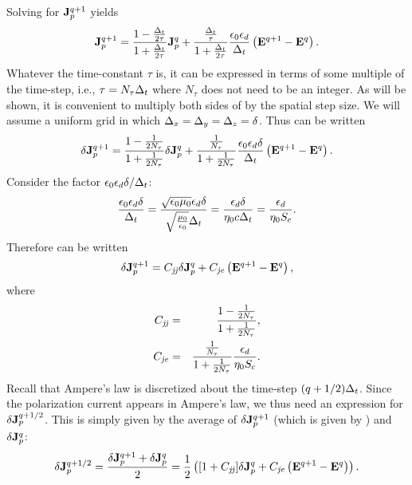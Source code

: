 Solving  for $\mathbf{J}_p^{q+1}$ yields
\begin{equation}
  \mathbf{J}_p^{q+1} =
    \frac{1-\frac{\Delta_t}{2\tau}}{1+\frac{\Delta_t}{2\tau}}\mathbf{J}_p^q +
    \frac{\frac{\Delta_t}{\tau}}{1+\frac{\Delta_t}{2\tau}}
    \frac{\epsilon_0\epsilon_d}{\Delta_t}
    \left(\mathbf{E}^{q+1}-\mathbf{E}^q\right).
    \label{eq:jpUpdateDebyeI}
\end{equation}
Whatever the  time-constant $\tau$ is, it can be expressed in terms of
some multiple of the time-step, i.e., $\tau=N_\tau\Delta_t$ where
$N_\tau$ does not need to be an integer.  As will be shown, it is
convenient to multiply both sides of  by the
spatial step size.  We will assume a uniform grid in which
$\Delta_x=\Delta_y=\Delta_z=\delta$.  Thus  can be
written
\begin{equation}
  \delta\mathbf{J}_p^{q+1} =
    \frac{1-\frac{1}{2N_\tau}}{1+\frac{1}{2N_\tau}}\delta\mathbf{J}_p^q +
    \frac{\frac{1}{N_\tau}}{1+\frac{1}{2N_\tau}}
    \frac{\epsilon_0\epsilon_d\delta}{\Delta_t}\left(\mathbf{E}^{q+1}-\mathbf{E}^q\right).
    \label{eq:jpUpdateDebyeII}
\end{equation}
Consider the factor $\epsilon_0\epsilon_d\delta/\Delta_t$:
\begin{equation}
  \frac{\epsilon_0\epsilon_d\delta}{\Delta_t} =
  \frac{\sqrt{\epsilon_0\mu_0}\epsilon_d\delta}{\sqrt{\frac{\mu_0}{\epsilon_0}}\Delta_t}
  =
  \frac{\epsilon_d\delta}{\eta_0 c\Delta_t} =
  \frac{\epsilon_d}{\eta_0 S_c}.
\end{equation}
Therefore  can be written
\begin{equation}
  \delta\mathbf{J}_p^{q+1} =
    C_{\mathit{jj}}\delta\mathbf{J}_p^q +
    C_{\mathit{je}}\left(\mathbf{E}^{q+1}-\mathbf{E}^q\right),
    \label{eq:jpUpdateDebyeIII}
\end{equation}
where
\begin{eqnarray}
  C_{\mathit{jj}} &=& \frac{1-\frac{1}{2N_\tau}}{1+\frac{1}{2N_\tau}}, \\
  C_{\mathit{je}} &=& \frac{\frac{1}{N_\tau}}{1+\frac{1}{2N_\tau}}
             \frac{\epsilon_d}{\eta_0 S_c}.
\end{eqnarray}
Recall that Ampere's law is discretized about the time-step
$(q+1/2)\Delta_t$.  Since the polarization current appears in Ampere's
law, we thus need an expression for $\delta\mathbf{J}_p^{q+1/2}$.  This is
simply given by the average of $\delta\mathbf{J}_p^{q+1}$ (which is given by
) and $\delta\mathbf{J}_p^{q}$:
\begin{equation}
  \delta\mathbf{J}_p^{q+1/2} =
  \frac{\delta\mathbf{J}_p^{q+1}+\delta\mathbf{J}_p^{q}}{2} = 
    \frac{1}{2}\left([1+C_{\mathit{jj}}]\delta\mathbf{J}_p^q +
    C_{\mathit{je}}\left(\mathbf{E}^{q+1}-\mathbf{E}^q\right)\right).
  \label{eq:jpDebyeHalf}
\end{equation}

